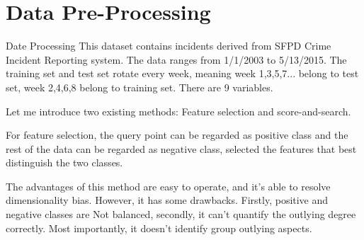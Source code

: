 \documentclass[
 size=14pt,
 paper=smartboard,  %
 mode=present, 		%
 display=slides, 	%
 style=tuliplab,  	%
 pauseslide,
 fleqn,leqno]{powerdot}
\begin{document}


\section{Data Pre-Processing}


\begin{slide}{Date Processing}
This dataset contains incidents derived from 
SFPD Crime Incident Reporting system. The data 
ranges from 1/1/2003 to 5/13/2015. The training 
set and test set rotate every week, meaning 
week 1,3,5,7... belong to test set, week 2,4,6,8 
belong to training set. There are 9 variables.


\bigskip





\begin{note}
Let me introduce two existing methods:
Feature selection and score-and-search.

For feature selection,
the query point can be regarded as positive class and
the rest of the data can be regarded as negative class,
selected the features that best distinguish the two classes.

The advantages of this method are easy to operate,
and it's able to resolve dimensionality bias.
However, it has some drawbacks.
Firstly,
positive and negative classes are Not balanced,
secondly,
it can't quantify the outlying degree correctly.
Most importantly,
it doesn't identify group outlying aspects.
\end{note}

\end{slide}
\end{document}

